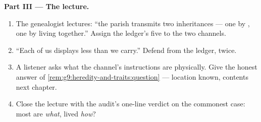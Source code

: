 \begin{problem}
\medskip\noindent\textbf{Part III --- The lecture.}
\begin{enumerate}[resume]
  \item The genealogist lectures: ``the parish transmits
        two inheritances --- one by , one by
        living together.'' Assign the ledger's five
         to the two channels.
  \item ``Each of us displays less than we carry.''
        Defend from the ledger, twice.
  \item A listener asks what the  channel's
        instructions are physically. Give the honest
        answer of \cref{rem:g9:heredity-and-traits:question}
        --- location known, contents next chapter.
  \item Close the lecture with the audit's one-line
        verdict on the commonest case: most  are
        \emph{what}, lived \emph{how}?
\end{enumerate}
\end{problem}

